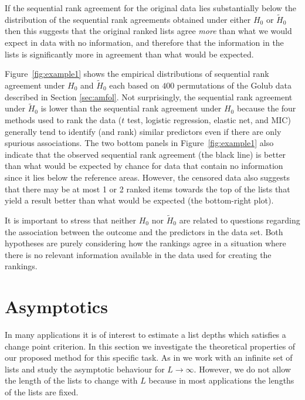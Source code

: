 \documentclass[12pt,a4paper]{article}
\theoremstyle{plain}
\begin{document}
If the sequential rank agreement for the original data lies
substantially below the distribution of the sequential rank agreements
obtained under either $H_0$ or $\widetilde H_0$ then this suggests that
the original ranked lists agree \emph{more} than what we would expect
in data with no information, and therefore that the information in the
lists is significantly more in agreement than what would be expected.

Figure~\ref{fig:example1} shows the empirical distributions of
sequential rank agreement under $H_0$ and $\widetilde H_0$ each based
on $400$ permutations of the Golub data described in Section
\ref{sec:amfol}. Not surprisingly, the sequential rank agreement under
$\widetilde H_0$ is lower than the sequential rank agreement under
$H_0$ because the four methods used to rank the data ($t$ test,
logistic regression, elastic net, and MIC) generally tend to identify
(and rank) similar predictors even if there are only spurious
associations. The two bottom panels in Figure~\ref{fig:example1} also
indicate that the observed sequential rank agreement (the black line)
is better than what would be expected by chance for data that contain
no information since it lies below the reference areas. However, the
censored data also suggests that there may be at most 1 or 2 ranked
items towards the top of the lists that yield a result better than
what would be expected (the bottom-right plot).

It is important to stress that neither $H_0$ nor $\widetilde H_0$ are
related to questions regarding the association between the outcome and
the predictors in the data set. Both hypotheses are purely considering
how the rankings agree in a situation where there is no relevant
information available in the data used for creating the rankings.



\section{Asymptotics}\label{sec:chgpoint}
In many applications it is of interest to estimate a list depths which
satisfies a change point criterion. In this section we investigate the
theoretical properties of our proposed method for this specific
task. As in \cite{hall:schi:2012} we work with an infinite set
of lists and study the asymptotic behaviour for $L\to\infty$.
However, we do not allow the length of the lists to change with $L$
because in most applications the lengths of the lists are fixed.
\end{document}
